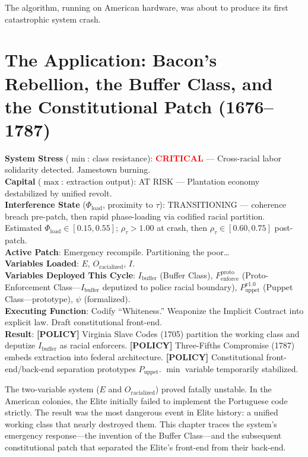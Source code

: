 \documentclass[12pt,openany]{book}
\begin{document}
The algorithm, running on American hardware, was about to produce its first catastrophic system crash.

\chapter{The Application: Bacon's Rebellion, the Buffer Class, and the Constitutional Patch (1676--1787)}

\begin{tcolorbox}[colback=black!5, colframe=black!70, fonttitle=\bfseries\ttfamily, title=RUNTIME LOG: 1676--1787 (VIRGINIA COLONY $\rightarrow$ PHILADELPHIA)]
\ttfamily\small
\textbf{System Stress} ($\min$: class resistance): \textcolor{red}{\textbf{CRITICAL}} --- Cross-racial labor solidarity detected. Jamestown burning.\\
\textbf{Capital} ($\max$: extraction output): AT RISK --- Plantation economy destabilized by unified revolt.\\
\textbf{Interference State} ($\Phi_{\text{load}}$, proximity to $\tau$): TRANSITIONING --- coherence breach pre-patch, then rapid phase-loading via codified racial partition. Estimated $\Phi_{\text{load}} \in [0.15, 0.55]$; $\rho_{\tau}>1.00$ at crash, then $\rho_{\tau} \in [0.60, 0.75]$ post-patch.\\
\textbf{Active Patch}: Emergency recompile. Partitioning the poor\ldots\\
\textbf{Variables Loaded}: $E$, $O_{\text{racialized}}$, $I$.\\
\textbf{Variables Deployed This Cycle}: $I_{\text{buffer}}$ (Buffer Class), $F_{\text{enforce}}^{\text{proto}}$ (Proto-Enforcement Class---$I_{\text{buffer}}$ deputized to police racial boundary), $P_{\text{uppet}}^{\text{v1.0}}$ (Puppet Class---prototype), $\psi$ (formalized).\\
\textbf{Executing Function}: Codify ``Whiteness.'' Weaponize the Implicit Contract into explicit law. Draft constitutional front-end.\\
\textbf{Result}: \textbf{[POLICY]} Virginia Slave Codes (1705) partition the working class and deputize $I_{\text{buffer}}$ as racial enforcers. \textbf{[POLICY]} Three-Fifths Compromise (1787) embeds extraction into federal architecture. \textbf{[POLICY]} Constitutional front-end/back-end separation prototypes $P_{\text{uppet}}$. $\min$ variable temporarily stabilized.
\end{tcolorbox}

\medskip

The two-variable system ($E$ and $O_{\text{racialized}}$) proved fatally unstable. In the American colonies, the Elite initially failed to implement the Portuguese code strictly. The result was the most dangerous event in Elite history: a unified working class that nearly destroyed them. This chapter traces the system's emergency response---the invention of the Buffer Class---and the subsequent constitutional patch that separated the Elite's front-end from their back-end.
\end{document}
